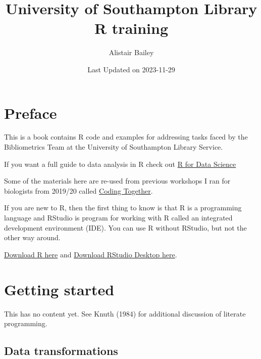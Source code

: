 \documentclass[
  letterpaper,
  DIV=11,
  numbers=noendperiod]{scrreprt}
\title{University of Southampton Library R training}
\author{Alistair Bailey}
\date{Last Updated on 2023-11-29}
\renewcommand*\contentsname{Table of contents}
\newcommand\contentsname{Table of contents}
\begin{document}
\maketitle
\ifdefined\Shaded\renewenvironment{Shaded}{\begin{tcolorbox}[borderline west={3pt}{0pt}{shadecolor}, frame hidden, interior hidden, enhanced, boxrule=0pt, sharp corners, breakable]}{\end{tcolorbox}}\fi

\renewcommand*\contentsname{Table of contents}
{
\hypersetup{linkcolor=}
\setcounter{tocdepth}{2}
\tableofcontents
}

\hypertarget{preface}{%
\chapter*{Preface}\label{preface}}


This is a book contains R code and examples for addressing tasks faced
by the Bibliometrics Team at the University of Southampton Library
Service.

If you want a full guide to data analysis in R check out
\href{https://r4ds.hadley.nz/}{R for Data Science}

Some of the materials here are re-used from previous workshops I ran for
biologists from 2019/20 called
\href{https://ab604.github.io/docs/coding-together-2019/}{Coding
Together}.

If you are new to R, then the first thing to know is that R is a
programming language and RStudio is program for working with R called an
integrated development environment (IDE). You can use R without RStudio,
but not the other way around.

\href{https://cran.r-project.org/}{Download R here} and
\href{https://posit.co/download/rstudio-desktop/}{Download RStudio
Desktop here}.


\hypertarget{getting-started}{%
\chapter{Getting started}\label{getting-started}}

This has no content yet. See Knuth (1984) for additional discussion of
literate programming.

\hypertarget{data-transformations}{%
\section{Data transformations}\label{data-transformations}}
\end{document}
